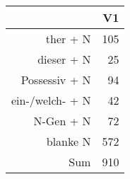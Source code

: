 \begin{tabular}{rr}
  \hline
 & V1 \\ 
  \hline
ther + N & 105 \\ 
  dieser + N &  25 \\ 
  Possessiv + N &  94 \\ 
  ein-/welch- + N &  42 \\ 
  N-Gen + N &  72 \\ 
  blanke N & 572 \\ 
  Sum & 910 \\ 
   \hline
\end{tabular}

